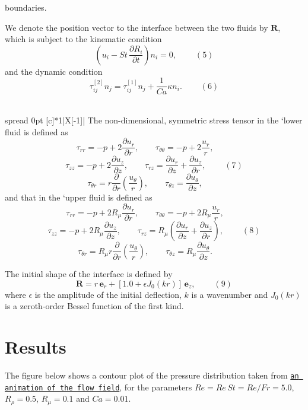 \begin{center}
\begin{longtabu}
boundaries.

We denote the position vector to the interface between the two fluids by $ \mathbf{R} $, which is subject to the kinematic condition \[ \left(u_i - St\, \frac{\partial R_i}{\partial t}\right) n_i = 0, \ \ \ \ \ \ \ \ \ \ (5) \] and the dynamic condition \[ \tau_{ij}^{[2]}n_j = \tau_{ij}^{[1]}n_j+\frac{1}{Ca}\kappa n_i. \ \ \ \ \ \ \ \ \ \ (6) \]   \\
\end{longtabu}
\end{center} 

\begin{center} \tabulinesep=1mm
\begin{longtabu} spread 0pt [c]{*{1}{|X[-1]}|}
\hline
The non-\/dimensional, symmetric stress tensor in the `lower\textquotesingle{} fluid is defined as \[ \tau_{rr} = -p + 2\frac{\partial u_r}{\partial r}, \qquad \tau_{\theta\theta} = -p + 2\frac{u_r}{r}, \ \ \ \ \ \ \ \ \ \ \] \[ \tau_{zz} = -p + 2\frac{\partial u_z}{\partial z}, \qquad \tau_{rz} = \frac{\partial u_r}{\partial z} + \frac{\partial u_z}{\partial r}, \ \ \ \ \ \ \ \ \ \ (7) \] \[ \tau_{\theta r} = r \frac{\partial}{\partial r}\left(\frac{u_{\theta}}{r}\right), \qquad \tau_{\theta z} = \frac{\partial u_{\theta}}{\partial z}, \ \ \ \ \ \ \ \ \ \ \] and that in the `upper\textquotesingle{} fluid is defined as \[ \tau_{rr} = -p + 2R_\mu \frac{\partial u_r}{\partial r}, \qquad \tau_{\theta\theta} = -p + 2R_\mu \frac{u_r}{r}, \ \ \ \ \ \ \ \ \ \ \] \[ \tau_{zz} = -p + 2R_\mu \frac{\partial u_z}{\partial z}, \qquad \tau_{rz} = R_\mu \left(\frac{\partial u_r}{\partial z} + \frac{\partial u_z}{\partial r}\right), \ \ \ \ \ \ \ \ \ \ (8) \] \[ \tau_{\theta r} = R_\mu r \frac{\partial}{\partial r}\left(\frac{u_{\theta}}{r}\right), \qquad \tau_{\theta z} = R_\mu \frac{\partial u_{\theta}}{\partial z}. \ \ \ \ \ \ \ \ \ \ \]

The initial shape of the interface is defined by \[ \mathbf{R} = r \, \mathbf{e}_r + \left[ 1.0 + \epsilon J_0(kr) \right] \, \mathbf{e}_z, \ \ \ \ \ \ \ \ \ \ (9) \] where $ \epsilon $ is the amplitude of the initial deflection, $ k $ is a wavenumber and $ J_0(kr) $ is a zeroth-\/order Bessel function of the first kind.   \\
\end{longtabu}
\end{center} 



 

\hypertarget{index_results}{}\section{Results}\label{index_results}
The figure below shows a contour plot of the pressure distribution taken from \href{../figures/two_layer_interface_axisym.avi}{\tt an animation of the flow field}, for the parameters $ Re = Re \, St = Re/Fr = 5.0 $, $ R_\rho = 0.5 $, $ R_\mu = 0.1 $ and $ Ca = 0.01 $.

